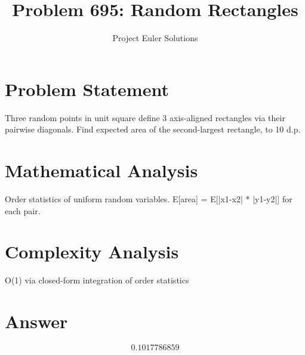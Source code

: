 \documentclass[11pt]{article}
\title{Problem 695: Random Rectangles}
\author{Project Euler Solutions}
\date{}
\begin{document}
\maketitle

\section{Problem Statement}

Three random points in unit square define 3 axis-aligned rectangles via their pairwise diagonals. Find expected area of the second-largest rectangle, to 10 d.p.

\section{Mathematical Analysis}

Order statistics of uniform random variables. E[area] = E[|x1-x2| * |y1-y2|] for each pair.

\section{Complexity Analysis}

O(1) via closed-form integration of order statistics

\section{Answer}

\[
\boxed{0.1017786859}
\]
\end{document}
